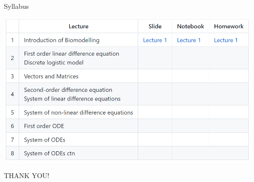 \documentclass[pdf,aspectratio=169]{beamer}
\begin{document}
\begin{frame}{Syllabus}
    \begin{center}
    \includegraphics[scale = 0.32]{figs/syllabus.png}
    \end{center}
\end{frame}

%    


\begin{frame}[plain]
    \begin{center}
        \vspace{1cm}
        \Huge THANK YOU!
    \end{center}
\end{frame}
\end{document}
